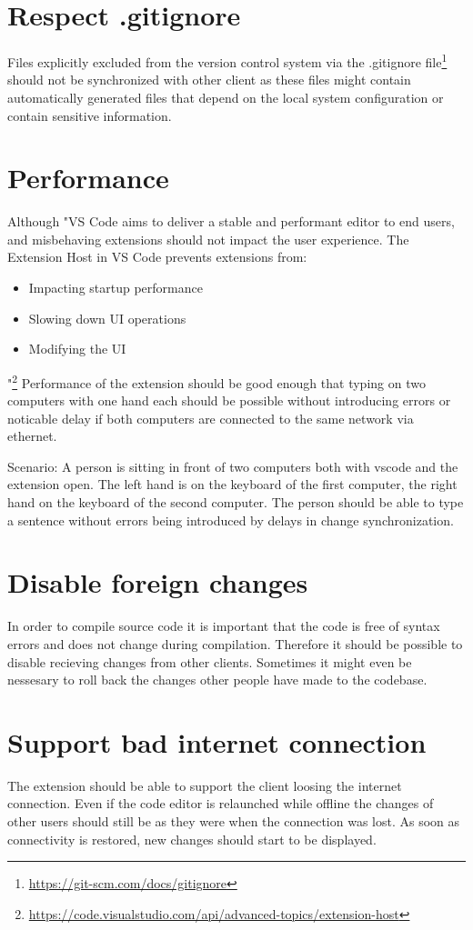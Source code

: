 \section{Respect .gitignore}

Files explicitly excluded from the version control system via the .gitignore file\footnote{\href{https://git-scm.com/docs/gitignore}{https://git-scm.com/docs/gitignore}} should not be synchronized with other client as these files might contain automatically generated files that depend on the local system configuration or contain sensitive information.

\section{Performance}

Although "VS Code aims to deliver a stable and performant editor to end users, and misbehaving extensions should not impact the user experience. The Extension Host in VS Code prevents extensions from:
\begin{itemize}
    \item Impacting startup performance
    \item Slowing down UI operations
    \item Modifying the UI
\end{itemize}"\footnote{\href{https://code.visualstudio.com/api/advanced-topics/extension-host}{https://code.visualstudio.com/api/advanced-topics/extension-host}}
Performance of the extension should be good enough that typing on two computers with one hand each should be possible without introducing errors or noticable delay if both computers are connected to the same network via ethernet.

Scenario: A person is sitting in front of two computers both with vscode and the extension open. The left hand is on the keyboard of the first computer, the right hand on the keyboard of the second computer. The person should be able to type a sentence without errors being introduced by delays in change synchronization.

\section{Disable foreign changes}

In order to compile source code it is important that the code is free of syntax errors and does not change during compilation. Therefore it should be possible to disable recieving changes from other clients. Sometimes it might even be nessesary to roll back the changes other people have made to the codebase.

\section{Support bad internet connection}

The extension should be able to support the client loosing the internet connection. Even if the code editor is relaunched while offline the changes of other users should still be as they were when the connection was lost. As soon as connectivity is restored, new changes should start to be displayed. 